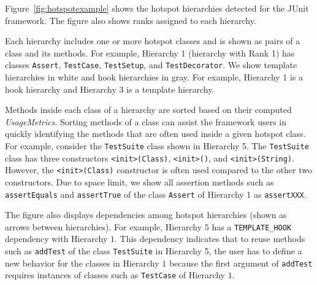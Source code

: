 \documentclass[conference]{IEEEtran}
\newcommand{\CodeIn}[1]{{\small\texttt{#1}}}
\newcommand{\Comment}[1]{}
\begin{document}
Figure~\ref{fig:hotspotexample} shows the hotspot hierarchies detected for the JUnit
framework. The figure also shows ranks assigned to each hierarchy.
\Comment{As the rank attribute uniquely identifies a hierarchy, we use the
rank as an identity for describing a hierarchy.}
Each hierarchy includes one or more hotspot classes and is shown as pairs of a class and its methods.
For example, Hierarchy 1 (hierarchy with Rank 1) has classes \CodeIn{Assert}, \CodeIn{TestCase}, \CodeIn{TestSetup},
and \CodeIn{TestDecorator}. We show template hierarchies in white and hook hierarchies in gray.
For example, Hierarchy 1 is a hook hierarchy and Hierarchy 3 is a template hierarchy.

Methods inside each class of a hierarchy are sorted
based on their computed \emph{UsageMetrics}. Sorting methods of a class
can assist the framework users in quickly identifying the methods that are often
used inside a given hotspot class. For example, consider the \CodeIn{TestSuite} class
shown in Hierarchy 5. The \CodeIn{TestSuite} class has three constructors \CodeIn{<init>(Class)},
\CodeIn{<init>()}, and \CodeIn{<init>(String)}. However, the \CodeIn{<init>(Class)} constructor
is often used compared to the other two constructors. Due to space limit,
we show all assertion methods such as \CodeIn{assertEquals} and \CodeIn{assertTrue}
of the class \CodeIn{Assert} of Hierarchy 1 as \CodeIn{assertXXX}.

The figure also displays dependencies among hotspot hierarchies 
(shown as arrows between hierarchies). \Comment{SpotWeb captures the
usage relationships among hotspot classes through dependencies.}
For example, Hierarchy $5$ has a
\CodeIn{TEMPLATE\_HOOK} dependency with Hierarchy $1$. This
dependency indicates that to reuse methods such as \CodeIn{addTest}
of the class \CodeIn{TestSuite} in Hierarchy 5, the user has to
define a new behavior for the classes in Hierarchy $1$ because the first argument
of \CodeIn{addTest} requires instances of classes such as \CodeIn{TestCase} of Hierarchy $1$.
\end{document}
